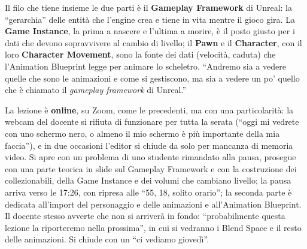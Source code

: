 Il filo che tiene insieme le due parti è il \textbf{Gameplay Framework} di Unreal: la
``gerarchia'' delle entità che l'engine crea e tiene in vita mentre il gioco gira. La
\textbf{Game Instance}, la prima a nascere e l'ultima a morire, è il posto giusto per i
dati che devono sopravvivere al cambio di livello; il \textbf{Pawn} e il
\textbf{Character}, con il loro \textbf{Character Movement}, sono la fonte dei dati
(velocità, caduta) che l'Animation Blueprint legge per animare lo scheletro. ``Andremo
sia a vedere quelle che sono le animazioni e come si gestiscono, ma sia a vedere un po'
quello che è chiamato il \emph{gameplay framework} di Unreal.''

La lezione è \textbf{online}, su Zoom, come le precedenti, ma con una particolarità: la
webcam del docente si rifiuta di funzionare per tutta la serata (``oggi mi vedrete con
uno schermo nero, o almeno il mio schermo è più importante della mia faccia''), e in
due occasioni l'editor si chiude da solo per mancanza di memoria video. Si apre con un
problema di uno studente rimandato alla pausa, prosegue con una parte teorica in slide
sul Gameplay Framework e con la costruzione dei collezionabili, della Game Instance e
dei volumi che cambiano livello; la pausa arriva verso le 17:26, con ripresa alle ``55,
18, solito orario''; la seconda parte è dedicata all'import del personaggio e delle
animazioni e all'Animation Blueprint. Il docente stesso avverte che non si arriverà in
fondo: ``probabilmente questa lezione la riporteremo nella prossima'', in cui si vedranno
i Blend Space e il resto delle animazioni. Si chiude con un ``ci vediamo giovedì''.

